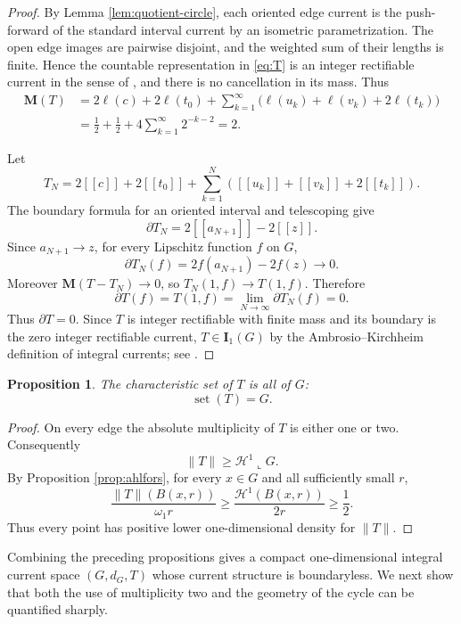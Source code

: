 \documentclass[11pt]{article}
\newtheorem{proposition}[theorem]{Proposition}
\theoremstyle{remark}
\newcommand{\M}{\mathbf M}
\newcommand{\I}{\mathbf I}
\newcommand{\Hh}{\mathcal H}
\newcommand{\set}{\operatorname{set}}
\newcommand{\llbracket}{[\![}
\newcommand{\rrbracket}{]\!]}
\begin{document}
\begin{proof}
By Lemma \ref{lem:quotient-circle}, each oriented edge current is the push-forward of the standard interval current by an isometric parametrization. The open edge images are pairwise disjoint, and the weighted sum of their lengths is finite. Hence the countable representation in \eqref{eq:T} is an integer rectifiable current in the sense of \cite[Section 4]{AK00}, and there is no cancellation in its mass. Thus
\[
\begin{aligned}
 \M(T)
 &=2\ell(c)+2\ell(t_0)
   +\sum_{k=1}^{\infty}
      \bigl(\ell(u_k)+\ell(v_k)+2\ell(t_k)\bigr)\\
 &=\frac12+\frac12+4\sum_{k=1}^{\infty}2^{-k-2}
 =2.
\end{aligned}
\]

Let
\[
 T_N=2\llbracket c\rrbracket+2\llbracket t_0\rrbracket
 +\sum_{k=1}^{N}
 \left(\llbracket u_k\rrbracket+\llbracket v_k\rrbracket
 +2\llbracket t_k\rrbracket\right).
\]
The boundary formula for an oriented interval and telescoping give
\[
      \partial T_N=2\llbracket a_{N+1}\rrbracket-2\llbracket z\rrbracket.
\]
Since $a_{N+1}\to z$, for every Lipschitz function $f$ on $G$,
\[
      \partial T_N(f)=2f(a_{N+1})-2f(z)\longrightarrow0.
\]
Moreover $\M(T-T_N)\to0$, so $T_N(1,f)\to T(1,f)$. Therefore
\[
      \partial T(f)=T(1,f)=\lim_{N\to\infty}\partial T_N(f)=0.
\]
Thus $\partial T=0$. Since $T$ is integer rectifiable with finite mass and its boundary is the zero integer rectifiable current, $T\in\I_1(G)$ by the Ambrosio--Kirchheim definition of integral currents; see \cite[Sections 4 and 8]{AK00}.
\end{proof}

\begin{proposition}\label{prop:setT}
The characteristic set of $T$ is all of $G$:
\[
     \set(T)=G.
\]
\end{proposition}

\begin{proof}
On every edge the absolute multiplicity of $T$ is either one or two. Consequently
\[
      \|T\|\ge \Hh^1\llcorner G.
\]
By Proposition \ref{prop:ahlfors}, for every $x\in G$ and all sufficiently small $r$,
\[
  \frac{\|T\|(B(x,r))}{\omega_1 r}
  \ge \frac{\Hh^1(B(x,r))}{2r}
  \ge\frac12.
\]
Thus every point has positive lower one-dimensional density for $\|T\|$.
\end{proof}

Combining the preceding propositions gives a compact one-dimensional integral current space $(G,d_G,T)$ whose current structure is boundaryless. We next show that both the use of multiplicity two and the geometry of the cycle can be quantified sharply.
\end{document}
